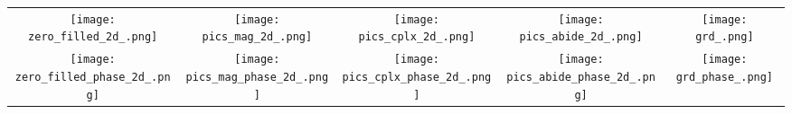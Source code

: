 {
    \renewcommand{\arraystretch}{0}

\begin{tabular}{c @{\hskip 0pt} c @{\hskip 0pt} c @{\hskip 0pt} c@{\hskip 0pt} c}
    \texttt{[image: zero\_filled\_2d\_.png]}&
    \texttt{[image: pics\_mag\_2d\_.png]}&
    \texttt{[image: pics\_cplx\_2d\_.png]}&
    \texttt{[image: pics\_abide\_2d\_.png]}&
    \texttt{[image: grd\_.png]}\\
    \texttt{[image: zero\_filled\_phase\_2d\_.png]}&
    \texttt{[image: pics\_mag\_phase\_2d\_.png]}&
    \texttt{[image: pics\_cplx\_phase\_2d\_.png]}&
    \texttt{[image: pics\_abide\_phase\_2d\_.png]}&
    \texttt{[image: grd\_phase\_.png]}
\end{tabular}}